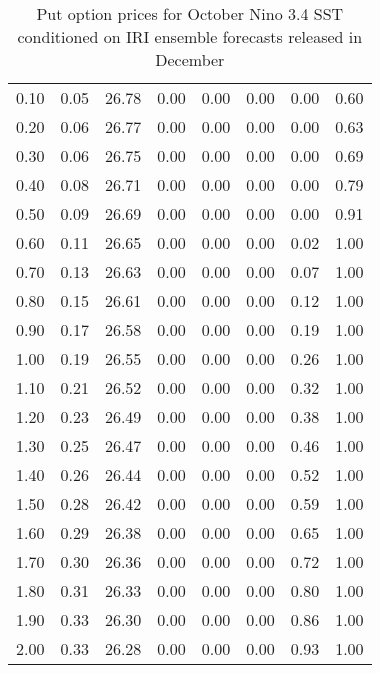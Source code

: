 \begin{table*}[ht]
\begin{tabular}{rrrrrrrr}
  0.10 & 0.05 & 26.78 & 0.00 & 0.00 & 0.00 & 0.00 & 0.60 \\ 
  0.20 & 0.06 & 26.77 & 0.00 & 0.00 & 0.00 & 0.00 & 0.63 \\ 
  0.30 & 0.06 & 26.75 & 0.00 & 0.00 & 0.00 & 0.00 & 0.69 \\ 
  0.40 & 0.08 & 26.71 & 0.00 & 0.00 & 0.00 & 0.00 & 0.79 \\ 
  0.50 & 0.09 & 26.69 & 0.00 & 0.00 & 0.00 & 0.00 & 0.91 \\ 
  0.60 & 0.11 & 26.65 & 0.00 & 0.00 & 0.00 & 0.02 & 1.00 \\ 
  0.70 & 0.13 & 26.63 & 0.00 & 0.00 & 0.00 & 0.07 & 1.00 \\ 
  0.80 & 0.15 & 26.61 & 0.00 & 0.00 & 0.00 & 0.12 & 1.00 \\ 
  0.90 & 0.17 & 26.58 & 0.00 & 0.00 & 0.00 & 0.19 & 1.00 \\ 
  1.00 & 0.19 & 26.55 & 0.00 & 0.00 & 0.00 & 0.26 & 1.00 \\ 
  1.10 & 0.21 & 26.52 & 0.00 & 0.00 & 0.00 & 0.32 & 1.00 \\ 
  1.20 & 0.23 & 26.49 & 0.00 & 0.00 & 0.00 & 0.38 & 1.00 \\ 
  1.30 & 0.25 & 26.47 & 0.00 & 0.00 & 0.00 & 0.46 & 1.00 \\ 
  1.40 & 0.26 & 26.44 & 0.00 & 0.00 & 0.00 & 0.52 & 1.00 \\ 
  1.50 & 0.28 & 26.42 & 0.00 & 0.00 & 0.00 & 0.59 & 1.00 \\ 
  1.60 & 0.29 & 26.38 & 0.00 & 0.00 & 0.00 & 0.65 & 1.00 \\ 
  1.70 & 0.30 & 26.36 & 0.00 & 0.00 & 0.00 & 0.72 & 1.00 \\ 
  1.80 & 0.31 & 26.33 & 0.00 & 0.00 & 0.00 & 0.80 & 1.00 \\ 
  1.90 & 0.33 & 26.30 & 0.00 & 0.00 & 0.00 & 0.86 & 1.00 \\ 
  2.00 & 0.33 & 26.28 & 0.00 & 0.00 & 0.00 & 0.93 & 1.00 \\ 
   \hline
\end{tabular}
\caption{Put option prices for October Nino 3.4 SST conditioned on IRI ensemble forecasts released in December} 
\end{table*}

